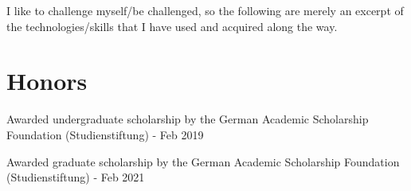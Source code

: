 \documentclass[a4paper,20pt]{article}
\begin{document}
I like to challenge myself/be challenged, so the following are merely an excerpt of the technologies/skills that I have used and acquired along the way.
\vspace{-5pt}
\resumeSubHeadingListStart
{}
\resumeSubHeadingListEnd

\section{Honors}
\begin{description}[font=$\bullet$]
\item {Awarded undergraduate scholarship by the German Academic Scholarship Foundation (Studienstiftung) - Feb 2019}
\vspace{-5pt}
\item {Awarded graduate scholarship by the German Academic Scholarship Foundation (Studienstiftung) - Feb 2021}
\end{description}
\end{document}
